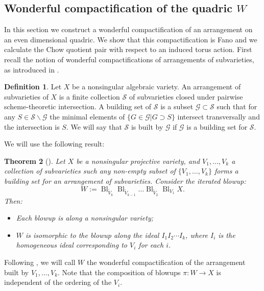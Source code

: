 \documentclass{amsart}
\newtheorem{theorem}{Theorem}[section]
\theoremstyle{definition}
\newtheorem{definition}[theorem]{Definition}
\DeclareMathOperator{\Bl}{Bl}
\begin{document}
\subsection{Wonderful compactification of the quadric $W$} \label{subsec:wonderful}
In this section we construct a wonderful compactification of an arrangement on an even dimensional quadric. We show that this compactification is Fano and we calculate the Chow quotient pair with respect to an induced torus action. First recall the notion of wonderful compactifications of arrangements of subvarieties, as introduced in \cite{li06}.
\begin{definition}
Let \(X\) be a nonsingular algebraic variety. An arrangement of subvarieties of \(X\) is a finite collection \(\mathcal{S}\) of subvarieties closed under pairwise scheme-theoretic intersection. A building set of \(\mathcal{S}\) is a subset \(\mathcal{G} \subset \mathcal{S}\) such that for any \(S \in \mathcal{S} \backslash \mathcal{G}\) the minimal elements of \(\{G \in \mathcal{G} | G \supset S\}\) intersect transversally and the intersection is \(S\). We will say that \(\mathcal{S}\) is built by \(\mathcal{G}\) if \(\mathcal{G}\) is a building set for \(\mathcal{S}\).
\end{definition}
We will use the following result:
\begin{theorem}[{\cite[Theorem 1.3]{li06}}] \label{thm:wonderful}
Let \(X\) be a nonsingular projective variety, and \(V_1,\dots,V_k\) a collection of subvarieties such any non-empty subset of \(\{V_1,\dots, V_k\}\) forms a building set for an arrangement of subvarieties. Consider the iterated blowup:
\[
W := \Bl_{\tilde{V}_k} \Bl_{\tilde{V}_{k-1}} \dots \Bl_{\tilde{V}_2} \Bl_{V_1} X.
\]
Then:
\begin{itemize}
\item Each blowup is along a nonsingular variety;
\item \(W\) is isomorphic to the blowup along the ideal \(I_1 I_2 \cdots I_k\), where \(I_i\) is the homogeneous ideal corresponding to \(V_i\) for each \(i\).
\end{itemize}
\end{theorem}
Following \cite{li06}, we will call \(W\) the wonderful compactification of the arrangement built by \(V_1,\dots,V_k\). Note that the composition of blowups \(\pi: W \to X\) is independent of the ordering of the \(V_i\).
\end{document}
